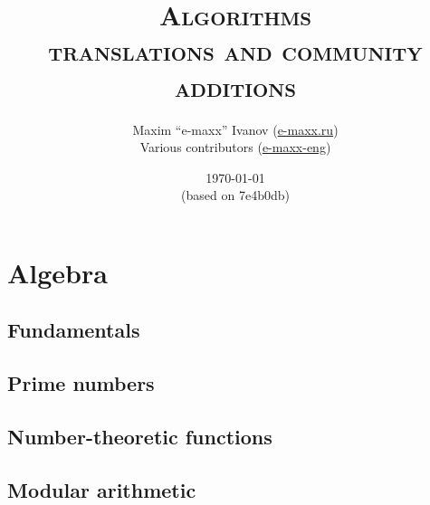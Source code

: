 \documentclass[11pt,a4paper,oneside]{book}
\title{\textsc{{\Huge Algorithms} \\ {\Large translations and community additions}}}
\author{
    Maxim ``e-maxx'' Ivanov (\href{http://e-maxx.ru/}{e-maxx.ru}) \\
    Various contributors (\href{https://github.com/e-maxx-eng/e-maxx-eng}{e-maxx-eng})}
\date{\today{} \\
{\footnotesize(based on 7e4b0db)}}
\let\Oldpart\part
\newcommand\parttitle{}
\renewcommand\part[1]{\Oldpart{#1}\thispagestyle{empty}\renewcommand{\parttitle}{#1}}
\begin{document}
\pagestyle{empty}
\maketitle
\cleardoublepage

{
\hypersetup{linkcolor=black}
\setcounter{tocdepth}{1}
\tableofcontents
}
\cleardoublepage

\pagestyle{fancy}

\part{Algebra}
\chapter{Fundamentals}





\chapter{Prime numbers}




\chapter{Number-theoretic functions}


\chapter{Modular arithmetic}









\end{document}
